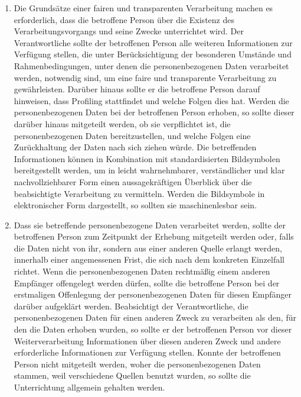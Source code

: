 \begin{enumerate}

   \item Die Grundsätze einer fairen und transparenten Verarbeitung machen es erforderlich, dass die betroffene Person
    über die Existenz des Verarbeitungsvorgangs und seine Zwecke unterrichtet wird. Der Verantwortliche sollte der
    betroffenen Person alle weiteren Informationen zur Verfügung stellen, die unter Berücksichtigung der besonderen
    Umstände und Rahmenbedingungen, unter denen die personenbezogenen Daten verarbeitet werden, notwendig sind, um eine
    faire und transparente Verarbeitung zu gewährleisten. Darüber hinaus sollte er die betroffene Person darauf
    hinweisen, dass Profiling stattfindet und welche Folgen dies hat. Werden die personenbezogenen Daten bei der
    betroffenen Person erhoben, so sollte dieser darüber hinaus mitgeteilt werden, ob sie verpflichtet ist, die
    personenbezogenen Daten bereitzustellen, und welche Folgen eine Zurückhaltung der Daten nach sich ziehen würde. Die
    betreffenden Informationen können in Kombination mit standardisierten Bildsymbolen bereitgestellt werden, um in
    leicht wahrnehmbarer, verständlicher und klar nachvollziehbarer Form einen aussagekräftigen Überblick über die
    beabsichtigte Verarbeitung zu vermitteln. Werden die Bildsymbole in elektronischer Form dargestellt, so sollten sie
    maschinenlesbar sein.%
   \label{itm:eg-60}
   

   \item Dass sie betreffende personenbezogene Daten verarbeitet werden, sollte der betroffenen Person zum Zeitpunkt der
    Erhebung mitgeteilt werden oder, falls die Daten nicht von ihr, sondern aus einer anderen Quelle erlangt werden,
    innerhalb einer angemessenen Frist, die sich nach dem konkreten Einzelfall richtet. Wenn die personenbezogenen
    Daten rechtmäßig einem anderen Empfänger offengelegt werden dürfen, sollte die betroffene Person bei der
    erstmaligen Offenlegung der personenbezogenen Daten für diesen Empfänger darüber aufgeklärt werden. Beabsichtigt
    der Verantwortliche, die personenbezogenen Daten für einen anderen Zweck zu verarbeiten als den, für den die Daten
    erhoben wurden, so sollte er der betroffenen Person vor dieser Weiterverarbeitung Informationen über diesen anderen
    Zweck und andere erforderliche Informationen zur Verfügung stellen. Konnte der betroffenen Person nicht mitgeteilt
    werden, woher die personenbezogenen Daten stammen, weil verschiedene Quellen benutzt wurden, so sollte die
    Unterrichtung allgemein gehalten werden.%
   \label{itm:eg-61}
   

\end{enumerate}

